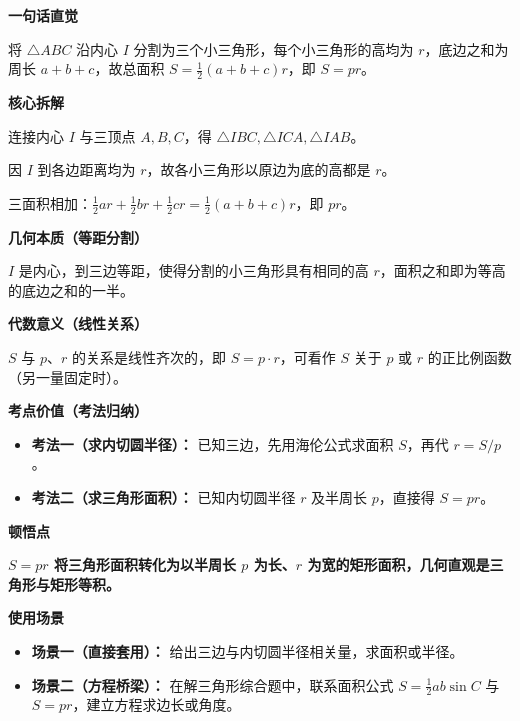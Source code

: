 \begin{explanationbox}
	\textbf{\textcolor{CExplanation}{一句话直觉}}

	将 $\triangle ABC$ 沿内心 $I$ 分割为三个小三角形，每个小三角形的高均为 $r$，底边之和为周长 $a+b+c$，故总面积 $S = \frac12(a+b+c)r$，即 $S = pr$。

	\medskip
	\textbf{\textcolor{CExplanation}{核心拆解}}
	\begin{description}[style=nextline, leftmargin=2.8em, labelsep=0.5em, itemsep=0.45em]
		\item[\textbf{要点一（面积分割）：}] 连接内心 $I$ 与三顶点 $A,B,C$，得 $\triangle IBC,\triangle ICA,\triangle IAB$。
		\item[\textbf{要点二（统一高）：}] 因 $I$ 到各边距离均为 $r$，故各小三角形以原边为底的高都是 $r$。
		\item[\textbf{要点三（求和化简）：}] 三面积相加：$\frac12 a r+\frac12 b r+\frac12 c r = \frac12(a+b+c)r$，即 $pr$。
	\end{description}

	\medskip
	\textbf{\textcolor{CExplanation}{几何本质（等距分割）}}

	$I$ 是内心，到三边等距，使得分割的小三角形具有相同的高 $r$，面积之和即为等高的底边之和的一半。

	\medskip
	\textbf{\textcolor{CExplanation}{代数意义（线性关系）}}

	$S$ 与 $p$、$r$ 的关系是线性齐次的，即 $S = p\cdot r$，可看作 $S$ 关于 $p$ 或 $r$ 的正比例函数（另一量固定时）。

	\medskip
	\textbf{\textcolor{CExplanation}{考点价值（考法归纳）}}
	\begin{itemize}[leftmargin=*, itemsep=0.5em, topsep=0.4em]
		\item \textbf{考法一（求内切圆半径）：} 已知三边，先用海伦公式求面积 $S$，再代 $r = S/p$。
		\item \textbf{考法二（求三角形面积）：} 已知内切圆半径 $r$ 及半周长 $p$，直接得 $S=pr$。
	\end{itemize}

	\medskip
	\textbf{\textcolor{CExplanation}{顿悟点}}

	\textbf{$\displaystyle S=pr$ 将三角形面积转化为以半周长 $p$ 为长、$r$ 为宽的矩形面积，几何直观是三角形与矩形等积。}

	\medskip
	\textbf{\textcolor{CExplanation}{使用场景}}
	\begin{itemize}[leftmargin=*, itemsep=0.5em, topsep=0.4em]
		\item \textbf{场景一（直接套用）：} 给出三边与内切圆半径相关量，求面积或半径。
		\item \textbf{场景二（方程桥梁）：} 在解三角形综合题中，联系面积公式 $S=\frac12ab\sin C$ 与 $S=pr$，建立方程求边长或角度。
	\end{itemize}
\end{explanationbox}
